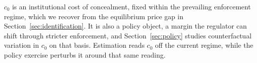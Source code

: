 $c_0$ is an institutional cost of concealment, fixed within the prevailing enforcement regime, which we recover from the equilibrium price gap in Section~\ref{sec:identification}. It is also a policy object, a margin the regulator can shift through stricter enforcement, and Section~\ref{sec:policy} studies counterfactual variation in $c_0$ on that basis. Estimation reads $c_0$ off the current regime, while the policy exercise perturbs it around that same reading.
